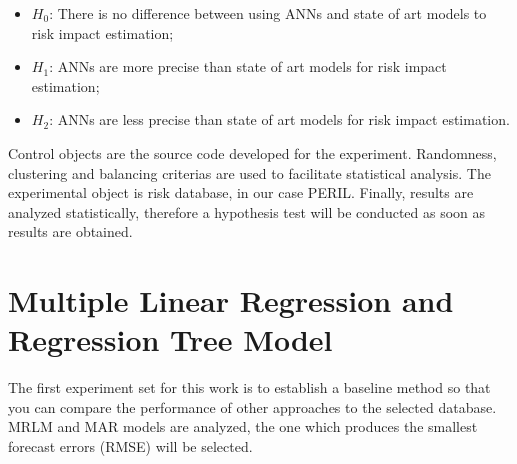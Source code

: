 \begin{itemize}
\item $H_0$: There is no difference between using ANNs and state of art models to risk impact estimation;
\item $H_1$: ANNs are more precise than state of art models for risk impact estimation;
\item $H_2$: ANNs are less precise than state of art models for risk impact estimation.
\end{itemize}

Control objects are the source code developed for the experiment. Randomness, clustering and balancing criterias are used to facilitate statistical analysis. The experimental object is risk database, in our case PERIL. Finally, results are analyzed statistically, therefore a hypothesis test will be conducted as soon as results are obtained.

\section{Multiple Linear Regression and Regression Tree Model}

The first experiment set for this work is to establish a baseline method so that you can compare the performance of other approaches to the selected database. MRLM and MAR models are analyzed, the one which produces the smallest forecast errors (RMSE) will be selected.

